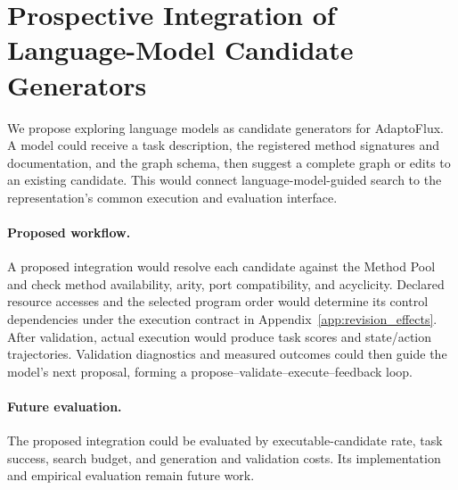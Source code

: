 \section{Prospective Integration of Language-Model Candidate Generators}
\label{app:llm_candidate_generation}

We propose exploring language models as candidate generators for AdaptoFlux. A model could receive a task description, the registered method signatures and documentation, and the graph schema, then suggest a complete graph or edits to an existing candidate. This would connect language-model-guided search to the representation's common execution and evaluation interface.

\paragraph{Proposed workflow.}
A proposed integration would resolve each candidate against the Method Pool and check method availability, arity, port compatibility, and acyclicity. Declared resource accesses and the selected program order would determine its control dependencies under the execution contract in Appendix~\ref{app:revision_effects}. After validation, actual execution would produce task scores and state/action trajectories. Validation diagnostics and measured outcomes could then guide the model's next proposal, forming a propose--validate--execute--feedback loop.

\paragraph{Future evaluation.}
The proposed integration could be evaluated by executable-candidate rate, task success, search budget, and generation and validation costs. Its implementation and empirical evaluation remain future work.

